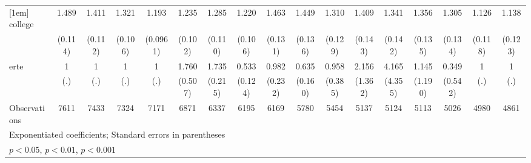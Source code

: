 {\begin{tabular}{l*{16}{c}}
[1em]
college             &       1.489\sym{***}&       1.411\sym{***}&       1.321\sym{***}&       1.193\sym{*}  &       1.235\sym{*}  &       1.285\sym{**} &       1.220\sym{*}  &       1.463\sym{***}&       1.449\sym{***}&       1.310\sym{**} &       1.409\sym{***}&       1.341\sym{**} &       1.356\sym{**} &       1.305\sym{**} &       1.126         &       1.138         \\
                    &     (0.114)         &     (0.112)         &     (0.106)         &    (0.0961)         &     (0.102)         &     (0.110)         &     (0.106)         &     (0.131)         &     (0.136)         &     (0.129)         &     (0.143)         &     (0.142)         &     (0.135)         &     (0.134)         &     (0.118)         &     (0.123)         \\
[1em]
erte                &           1         &           1         &           1         &           1         &       1.760\sym{*}  &       1.735\sym{***}&       0.533\sym{**} &       0.982         &       0.635         &       0.958         &       2.156         &       4.165         &       1.145         &       0.349         &           1         &           1         \\
                    &         (.)         &         (.)         &         (.)         &         (.)         &     (0.507)         &     (0.215)         &     (0.124)         &     (0.232)         &     (0.160)         &     (0.385)         &     (1.362)         &     (4.355)         &     (1.190)         &     (0.542)         &         (.)         &         (.)         \\
\hline
Observations        &        7611         &        7433         &        7324         &        7171         &        6871         &        6337         &        6195         &        6169         &        5780         &        5454         &        5137         &        5124         &        5113         &        5026         &        4980         &        4861         \\
\hline\hline
\multicolumn{17}{l}{\footnotesize Exponentiated coefficients; Standard errors in parentheses}\\
\multicolumn{17}{l}{\footnotesize \sym{*} \(p<0.05\), \sym{**} \(p<0.01\), \sym{***} \(p<0.001\)}\\
\end{tabular}
}
